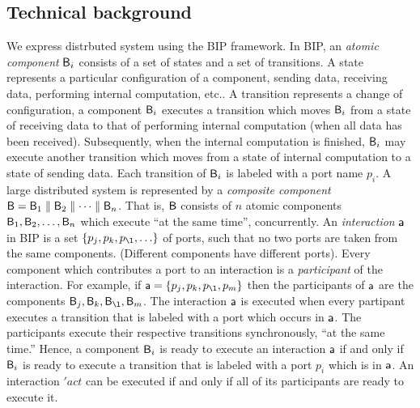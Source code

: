 

\subsection{Technical background}

We express distrbuted system using the BIP \cite{bip06,BliudzeS08} framework. In BIP, an \emph{atomic component} $\mathsf{B}_i$ consists of a set of states and a set of
transitions. A state represents a particular configuration of a component, \eg sending data, receiving data, performing internal computation, etc..
A transition represents a change of configuration, \eg a component $\mathsf{B}_i$ executes a transition which moves $\mathsf{B}_i$ from a 
state of receiving data to that of performing internal computation (\eg when all data has been received). Subsequently, when the internal computation
is finished, $\mathsf{B}_i$ may execute another transition which moves from a state of internal computation to a state of sending data.
Each transition of $\mathsf{B}_i$ is labeled with a port name $p_i$. 
A large distributed system is represented by a \emph{composite component} $\mathsf{B} = \mathsf{B}_1 \parallel \mathsf{B}_2 \parallel \cdots \parallel \mathsf{B}_n$. That is, $\mathsf{B}$ consists of $n$
atomic components $\mathsf{B}_1, \mathsf{B}_2,  \ldots,  \mathsf{B}_n$ which execute ``at the same time'', \ie concurrently. 
An \emph{interaction} $\mathsf{a}$ in BIP is a set $\{ p_j, p_k, p_{\l}, \ldots \}$ of ports, such that no two ports are taken from the same components.
(Different components have different ports). Every component which contributes a port to an interaction is a \emph{participant} of the interaction.
For example, if  $\act = \{ p_j, p_k, p_{\l}, p_m \}$ then the participants of $\mathsf{a}$ are the components $\B_j, \B_k, \B_{\l}, \B_m$.
The interaction $\mathsf{a}$ is executed when every partipant executes a transition that is labeled with a port which occurs in $\mathsf{a}$. 
The participants execute their respective transitions synchronously,
\ie ``at the same time.'' 
%
Hence, a component $\mathsf{B}_i$ is ready to execute an interaction $\mathsf{a}$
if and only if $\mathsf{B}_i$ is ready to execute a transition that is labeled
with a port $p_i$ which is in $\mathsf{a}$.
An interaction $'act$ can be executed if and only if all of its
participants are ready to execute it.